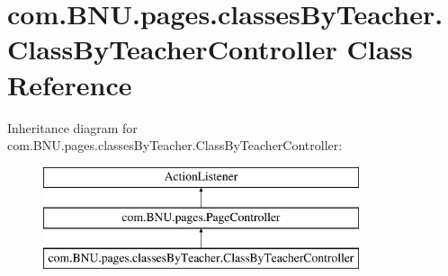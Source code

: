 \hypertarget{classcom_1_1_b_n_u_1_1pages_1_1classes_by_teacher_1_1_class_by_teacher_controller}{}\section{com.\+B\+N\+U.\+pages.\+classes\+By\+Teacher.\+Class\+By\+Teacher\+Controller Class Reference}
\label{classcom_1_1_b_n_u_1_1pages_1_1classes_by_teacher_1_1_class_by_teacher_controller}
Inheritance diagram for com.\+B\+N\+U.\+pages.\+classes\+By\+Teacher.\+Class\+By\+Teacher\+Controller\+:\begin{figure}[H]
\begin{center}
\leavevmode
\includegraphics[height=3.000000cm]{classcom_1_1_b_n_u_1_1pages_1_1classes_by_teacher_1_1_class_by_teacher_controller}
\end{center}
\end{figure}
